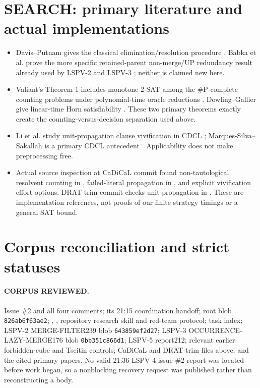 \documentclass[11pt]{article}
\begin{document}
\section{SEARCH: primary literature and actual implementations}
\begin{itemize}
\item Davis--Putnam gives the classical elimination/resolution procedure
\cite{DavisPutnam}.  Babka et al. prove the more specific retained-parent
non-merge/UP redundancy result already used by LSPV-2 and LSPV-3
\cite{Babka}; neither is claimed new here.
\item Valiant's Theorem 1 includes monotone 2-SAT among the \#P-complete
counting problems under polynomial-time oracle reductions \cite{Valiant}.
Dowling--Gallier give linear-time Horn satisfiability \cite{DowlingGallier}.
These two primary theorems exactly create the counting-versus-decision
separation used above.
\item Li et al. study unit-propagation clause vivification in CDCL
\cite{LiVivify}; Marques-Silva--Sakallah is a primary CDCL antecedent
\cite{GRASP}.  Applicability does not make preprocessing free.
\item Actual source inspection at CaDiCaL commit
 found non-tautological
resolvent counting in , failed-literal propagation in
, and explicit vivification effort options.  DRAT-trim
commit  checks unit propagation in
.  These are implementation references, not proofs of our
finite strategy timings or a general SAT bound.
\end{itemize}

\section{Corpus reconciliation and strict statuses}
\paragraph{CORPUS REVIEWED.}
Issue \#2 and all four comments; its 21:15 coordination handoff; root
 blob \texttt{826ab6f63ae2}; ,
, repository research skill and red-team protocol; task index;
LSPV-2 MERGE-FILTER239 blob \texttt{643859ef2d27}; LSPV-3
OCCURRENCE-LAZY-MERGE176 blob \texttt{0bb351c866d1}; LSPV-5 report212;
relevant earlier forbidden-cube and Tseitin controls; CaDiCaL and DRAT-trim
files above; and the cited primary papers.  No valid 21:36 LSPV-4 issue-\#2
report was located before work began, so a nonblocking recovery request was
published rather than reconstructing a body.
\end{document}
